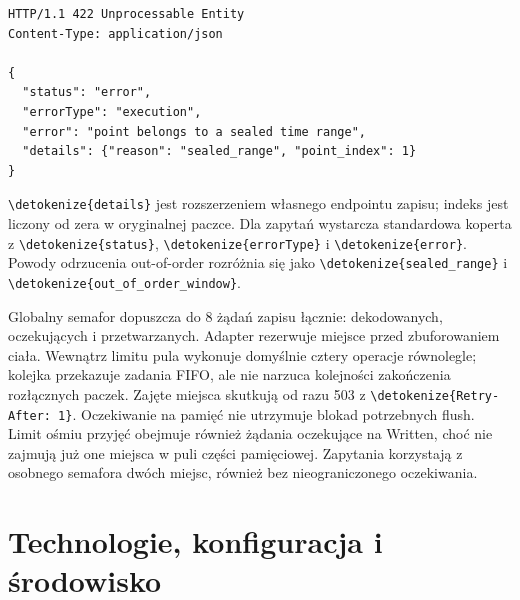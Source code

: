 \documentclass[11pt,a4paper]{article}
\newcommand{\code}[1]{\expandafter\nolinkurl\expandafter{\detokenize{#1}}}
\begin{document}
\begin{lstlisting}
HTTP/1.1 422 Unprocessable Entity
Content-Type: application/json

{
  "status": "error",
  "errorType": "execution",
  "error": "point belongs to a sealed time range",
  "details": {"reason": "sealed_range", "point_index": 1}
}
\end{lstlisting}

\code{details} jest rozszerzeniem własnego endpointu zapisu; indeks jest
liczony od zera w oryginalnej paczce. Dla zapytań wystarcza standardowa
koperta z \code{status}, \code{errorType} i \code{error}.
Powody odrzucenia out-of-order rozróżnia się jako
\code{sealed_range} i \code{out_of_order_window}.

Globalny semafor dopuszcza do 8 żądań zapisu łącznie: dekodowanych,
oczekujących i przetwarzanych. Adapter rezerwuje miejsce przed
zbuforowaniem ciała. Wewnątrz limitu pula wykonuje domyślnie cztery
operacje równolegle; kolejka przekazuje zadania FIFO, ale nie narzuca
kolejności zakończenia rozłącznych paczek.
Zajęte miejsca skutkują od razu 503 z \code{Retry-After: 1}.
Oczekiwanie na pamięć nie utrzymuje blokad potrzebnych flush.
Limit ośmiu przyjęć obejmuje również żądania oczekujące na Written,
choć nie zajmują już one miejsca w puli części pamięciowej.
Zapytania korzystają z osobnego semafora dwóch miejsc, również bez
nieograniczonego oczekiwania.


\section{Technologie, konfiguracja i środowisko}
\label{sec:technology}
\end{document}
